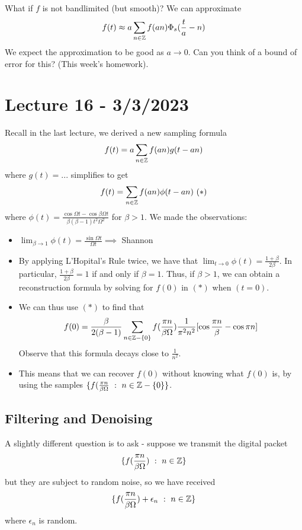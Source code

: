 \documentclass{article}
\begin{document}
\begin{question}
    What if $f$ is not bandlimited (but smooth)? We can approximate
    \[f(t) \approx a \sum_{n \in \mathbb{Z}} f(an) \Phi_s(\frac{t}{a} - n)\]
    We expect the approximation to be good as $a \to 0$. Can you think of a bound of error for this? (This week's homework).
\end{question}

\newpage
\section{Lecture 16 - 3/3/2023}


Recall in the last lecture, we derived a new sampling formula
\[f(t) = a \sum_{n \in \mathbb{Z}} f(an) g(t - an)\]
where $g(t) = ...$ simplifies to get
\begin{align*}
    f(t) = \sum_{n \in \mathbb{Z}} f(an) \phi(t - an)\ (*)
\end{align*}
where $\phi(t) = \frac{\cos \Omega t - \cos \beta \Omega t}{\beta(\beta - 1)t^2\Omega^2}$ for $\beta > 1$. We made the observations:
\begin{itemize}
    \item $\lim_{\beta \to 1} \phi(t) = \frac{\sin \Omega t}{\Omega t} \implies $ Shannon
    \item By applying L'Hopital's Rule twice, we have that $\lim_{t \to 0} \phi(t) = \frac{1 + \beta}{2\beta}$. In particular, $\frac{1 + \beta}{2\beta} = 1$ if and only if $\beta = 1$. Thus, if $\beta > 1$, we can obtain a reconstruction formula by solving for $f(0)$ in $(*)$ when $(t = 0)$.
    \item We can thus use $(*)$ to find that
    \[f(0) = \frac{\beta}{2(\beta - 1)} \sum_{n \in \mathbb{Z} - \{0\}} f(\frac{\pi n}{\beta \Omega}) \frac{1}{\pi^2 n^2} [\cos \frac{\pi n}{\beta} - \cos \pi n]\]
    Observe that this formula decays close to $\frac{1}{n^2}$.
    \item This means that we can recover $f(0)$ without knowing what $f(0)$ is, by using the samples $\{f(\frac{\pi n}{\beta \Omega}\ :\ n \in \mathbb{Z} - \{0\}\}$.
\end{itemize}

\subsection{Filtering and Denoising}

A slightly different question is to ask - suppose we transmit the digital packet
    \[\{f(\frac{\pi n}{\beta \Omega})\ :\ n \in \mathbb{Z}\}\]
    but they are subject to random noise, so we have received
    \[\{f(\frac{\pi n}{\beta \Omega}) + \epsilon_n \ :\ n \in \mathbb{Z}\}\]
    where $\epsilon_n$ is random.
\end{document}

